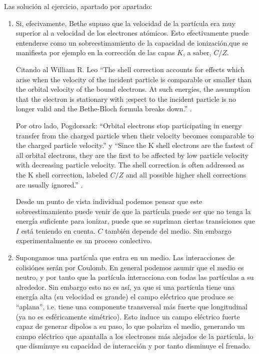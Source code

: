 Las solución al ejercicio, apartado por apartado: 
\begin{enumerate}[label=\alph*)]
    \item Si, efecivamente, Bethe supuso que la velocidad de la partícula era muy superior al a velocidad de los electrones atómicos. Esto efectivamente puede entenderse como un sobreestimamiento de la capacidad de ionización,que se manifiesta por ejemplo en la corrección de las capas $K$, a saber, $C/Z$.
    
    Citando al William R. Leo ``The shell correction accounts for effects which arise when the velocity of the incident particle is comparable or smaller than the orbital velocity of the bound electrons. At such energies, the assumption that the electron is stationary with ;espect to the incident particle is no longer valid and the Bethe-Bloch formula breaks down.'' \cite{Leo1994}.

    Por otro lado, Pogdorsark: ``Orbital electrons stop participating in energy transfer from the charged particle when their  velocity becomes comparable to the charged particle velocity.'' y ``Since the K shell electrons are the fastest of all orbital electrons, they are the first to be affected by low particle velocity with decreasing particle velocity. The shell correction is often addressed as the K shell correction, labeled $C/Z$ and all possible higher shell corrections are usually ignored.'' \cite{Podgorsak2022}.

    Desde un punto de vista individual podemos pensar que este sobreestimamiento puede venir de que la partícula puede ser que no tenga la energía suficiente para ionizar, puede que se supriman ciertas transiciones que $I$ está teniendo en cuenta. $C$ también depende del medio. Sin embargo experimentalmente es un proceso conlectivo. 

    \item Supongamos una partícula que entra en un medio. Las interacciones de colisiónes serán por Coulomb. En general podemos asumir que el medio es neutro, y por tanto que la partícula interacciona con todas las partículas a su alrededor. Sin embargo esto no es así, ya que si una partícula tiene una energía alta (su velocidad es grande) el campo eléctrico que produce se ``aplana'', i.e. tiene una componente transversal más fuerte que longitudinal (ya no es esféricamente simétrico). Esto induce un campo eléctrico fuerte capaz de generar dipolos a su paso, lo que polariza el medio, generando un campo eléctrico que apantalla a los electrones más alejados de la partícula, lo que disminuye su capacidad de interacción y por tanto disminuye el frenado. 
    

\end{enumerate}

